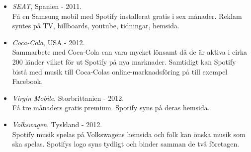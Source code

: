 \begin{itemize}
\item \emph{SEAT}, Spanien - 2011. \\
Få en Samsung mobil med Spotify installerat gratis i sex månader. Reklam syntes på TV, billboards, youtube, tidningar, hemsida.

\item \emph{Coca-Cola}, USA	- 2012.\\
Sammarbete med Coca-Cola can vara mycket lönsamt då de är aktiva i cirka 200 länder vilket för ut Spotify på nya marknader. Samtidigt kan Spotify bistå med musik till Coca-Colas online-marknadsföring på till exempel Facebook.

\item \emph{Virgin Mobile}, Storbrittanien - 2012. \\
Få tre månaders gratis premium. Spotify syns på deras hemsida.

\item \emph{Volkswagen}, Tyskland - 2012.\\
Spotify musik spelas på Volkswagens hemsida och folk kan önska musik som ska spelas. Spotifys logo syns tydligt och binder samman de två företagen.
\end{itemize}

